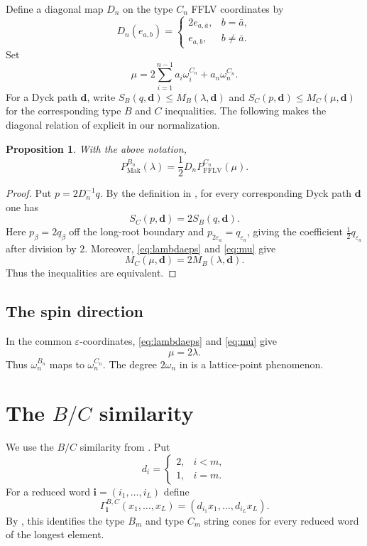 \documentclass[a4paper, 12pt]{amsart}
\newtheorem{proposition}[theorem]{Proposition}
\newcommand{\FFLV}{\mathrm{FFLV}}
\newcommand{\Mak}{\mathrm{Mak}}
\newcommand{\eps}{\varepsilon}
\begin{document}
Define a diagonal map $D_n$ on the type $C_n$ FFLV coordinates by
\begin{equation}\label{eq:D}
 D_n(e_{a,b})=
 \begin{cases}
 2e_{a,\bar a},&b=\bar a,\\
 e_{a,b},&b\neq\bar a.
 \end{cases}
\end{equation}
Set
\begin{equation}\label{eq:mu}
             \mu=2\sum_{i=1}^{n-1}a_i\omega_i^{C_n}+a_n\omega_n^{C_n}.
\end{equation}
For a Dyck path $\mathbf d$, write $S_B(q,\mathbf d)\leq M_B(\lambda,\mathbf d)$ and $S_C(p,\mathbf d)\leq M_C(\mu,\mathbf d)$ for the corresponding type $B$ and $C$ inequalities.
The following makes the diagonal relation of \cite[Remark~2.3]{Mak19} explicit in our normalization.
\begin{proposition}\label{prop:MakhlinC}
With the above notation,
\[
       P_{\Mak}^{B_n}(\lambda)
            =\frac12D_nP_{\FFLV}^{C_n}(\mu).
\]
\end{proposition}

\begin{proof}
Put $p=2D_n^{-1}q$. By the definition in \cite[Section~1]{Mak19}, for every corresponding Dyck path $\mathbf d$ one has
\[
             S_C(p,\mathbf d)=2S_B(q,\mathbf d).
\]
Here $p_\beta=2q_\beta$ off the long-root boundary and $p_{2\eps_a}=q_{\eps_a}$, giving the coefficient $\frac12q_{\eps_a}$ after division by $2$. Moreover, \eqref{eq:lambdaeps} and \eqref{eq:mu} give
\[
             M_C(\mu,\mathbf d)=2M_B(\lambda,\mathbf d).
\]
Thus the inequalities are equivalent.
\end{proof}

\subsection{The spin direction}

In the common $\eps$-coordinates, \eqref{eq:lambdaeps} and \eqref{eq:mu} give
\[
                              \mu=2\lambda.
\]
Thus $\omega_n^{B_n}$ maps to $\omega_n^{C_n}$. The degree $2\omega_n$ in \cite[Lemma~5.1]{Mak19} is a lattice-point phenomenon.

\section{The $B/C$ similarity}\label{sec:similarity}

We use the $B/C$ similarity from \cite{Kas96,CFL25}. Put
\begin{equation}\label{eq:di}
 d_i=\begin{cases}
 2,&i<m,\\
 1,&i=m.
 \end{cases}
\end{equation}
For a reduced word $\mathbf i=(i_1,\ldots,i_L)$ define
\[
 \Gamma_{\mathbf i}^{B,C}(x_1,\ldots,x_L)
       =(d_{i_1}x_1,\ldots,d_{i_L}x_L).
\]
By \cite[Theorem~3.2]{CFL25}, this identifies the type $B_m$ and type $C_m$ string cones for every reduced word of the longest element.
\end{document}
